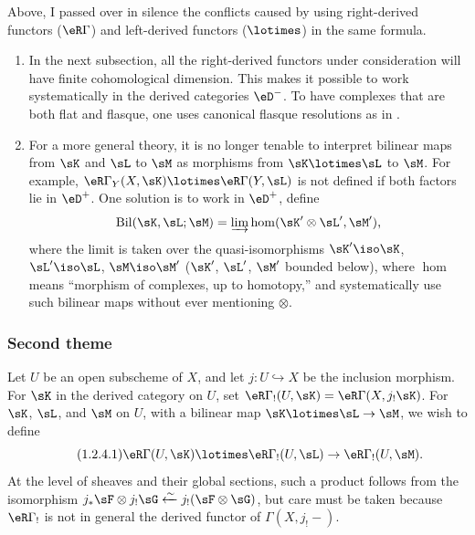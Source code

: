 Above, I passed over in silence the conflicts caused by using right-derived
functors ($\eR\Gamma$) and left-derived functors ($\lotimes$) in the same
formula.
\begin{enumerate}[\indent a)]
  \item In the next subsection, all the right-derived functors under
    consideration will have finite cohomological dimension. This makes it
    possible to work systematically in the derived categories $\eD^-$. To
    have complexes that are both flat and flasque, one uses canonical
    flasque resolutions as in .
  \item For a more general theory, it is no longer tenable to interpret bilinear maps
    from $\sK$ and $\sL$ to $\sM$ as morphisms from
    $\sK\lotimes\sL$ to $\sM$. For example,
    $\eR\Gamma_Y(X,\sK)\lotimes\eR\Gamma(Y,\sL)$ is not defined if both
    factors lie in $\eD^+$. One solution is to work in $\eD^+$, define
    \[
      \operatorname{Bil}(\sK,\sL;\sM) = \varinjlim \hom(\sK'\otimes\sL',\sM') \text{,}
    \]
    where the limit is taken over the quasi-isomorphisms $\sK'\iso \sK$,
    $\sL'\iso \sL$, $\sM\iso \sM'$ ($\sK'$, $\sL'$, $\sM'$ bounded
    below), where $\hom$ means ``morphism of complexes, up to homotopy,'' and
    systematically use such bilinear maps without ever mentioning
    $\otimes$.
\end{enumerate}





\subsubsection{Second theme}\label{IV:1-2-4}

Let $U$ be an open subscheme of $X$, and let $j:U\hookrightarrow X$ be the
inclusion morphism. For $\sK$ in the derived category on $U$, set
$\eR\Gamma_!(U,\sK)=\eR\Gamma(X,j_!\sK)$. For $\sK$, $\sL$, and $\sM$ on
$U$, with a bilinear map $\sK\lotimes\sL\to\sM$, we wish to define
\begin{equation*}\tag{1.2.4.1}\label{IV:eq:1-2-4-1}
  \eR\Gamma(U,\sK)\lotimes\eR\Gamma_!(U,\sL)\to\eR\Gamma_!(U,\sM) \text{.}
\end{equation*}
At the level of sheaves and their global sections, such a product follows
from the isomorphism
$j_*\sF\otimes j_!\sG\xleftarrow\sim j_!(\sF\otimes \sG)$, but care must be
taken because $\eR\Gamma_!$ is not in general the derived functor of
$\Gamma(X,j_!-)$.

